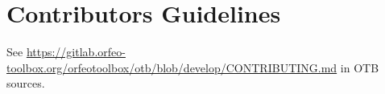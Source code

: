 \chapter{Contributors Guidelines}
\label{chapter:Contribute}

See
\url{https://gitlab.orfeo-toolbox.org/orfeotoolbox/otb/blob/develop/CONTRIBUTING.md}
in OTB sources.


